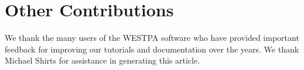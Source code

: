 \section{Other Contributions}


We thank the many users of the WESTPA software who have provided important feedback for improving our tutorials and documentation over the years.  
We thank Michael Shirts for assistance in generating this article.
